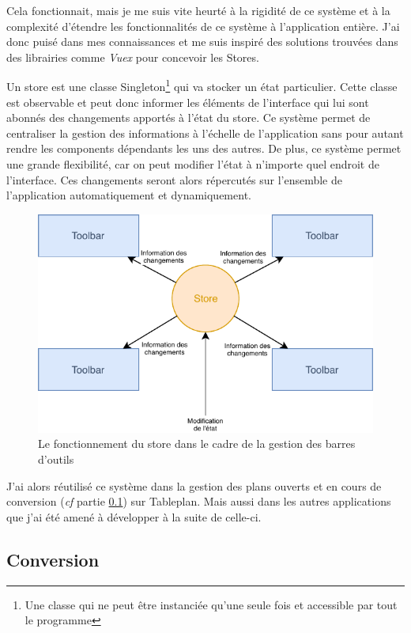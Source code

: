 Cela fonctionnait, mais je me suis vite heurté à la rigidité de ce système et à la complexité d'étendre les fonctionnalités de ce système à l'application entière.
J'ai donc puisé dans mes connaissances et me suis inspiré des solutions trouvées dans des librairies comme \emph{Vuex} pour concevoir les Stores.

Un store est une classe Singleton\footnote{Une classe qui ne peut être instanciée qu'une seule fois et accessible par tout le programme}  qui va stocker un état particulier.
Cette classe est observable et peut donc informer les éléments de l'interface qui lui sont abonnés des changements apportés à l'état du store.
Ce système permet de centraliser la gestion des informations à l'échelle de l'application sans pour autant rendre les components dépendants les uns des autres.
De plus, ce système permet une grande flexibilité, car on peut modifier l'état à n'importe quel endroit de l'interface.
Ces changements seront alors répercutés sur l'ensemble de l'application automatiquement et dynamiquement.

\begin{figure}[h]
    \centering
    \includegraphics[scale=1.5]{img/store.pdf}
    \caption{Le fonctionnement du store dans le cadre de la gestion des barres d'outils}
\end{figure}

J'ai alors réutilisé ce système dans la gestion des plans ouverts et en cours de conversion (\emph{cf} partie \ref{eiffageTablePlanConversion}) sur Tableplan.
Mais aussi dans les autres applications que j'ai été amené à développer à la suite de celle-ci.

\clearpage

\subsection{Conversion}
\label{eiffageTablePlanConversion}

